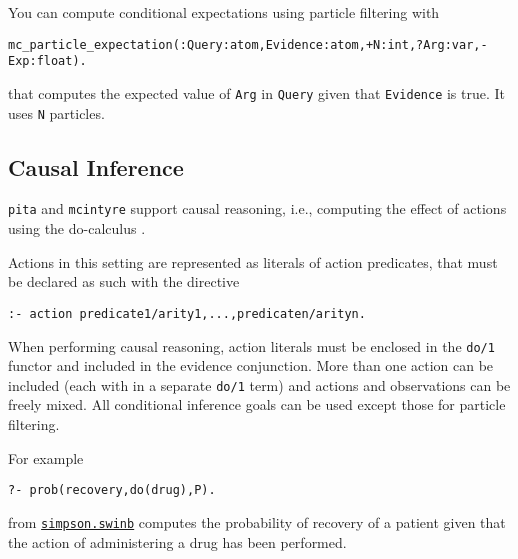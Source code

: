 You can compute conditional expectations using particle filtering with
\begin{verbatim}
mc_particle_expectation(:Query:atom,Evidence:atom,+N:int,?Arg:var,-Exp:float).
\end{verbatim}
that computes the expected value of \verb|Arg| in \verb|Query| given that
\verb|Evidence| is true.
It uses \verb|N| particles.

\subsection{Causal Inference}
\label{causal}

\verb|pita| and \verb|mcintyre| support causal reasoning, i.e., computing the effect of actions using the
do-calculus \cite{Pea00-book}.

Actions in this setting are represented as literals of action predicates, that must be declared as such
with the directive
\begin{verbatim}
:- action predicate1/arity1,...,predicaten/arityn.
\end{verbatim}
When performing causal reasoning, action literals must be enclosed in the \verb|do/1| functor and included in the evidence conjunction. More than one action can be included (each with in a separate
\verb|do/1| term) and actions and observations can be freely mixed.
All conditional inference goals can be used except those for particle filtering.

For example
\begin{verbatim}
?- prob(recovery,do(drug),P).
\end{verbatim}
from \href{http://cplint.ml.unife.it/example/inference/simpson.swinb}{\texttt{simpson.swinb}}
computes the probability of recovery of a patient given that the action of administering a drug has
been performed.
